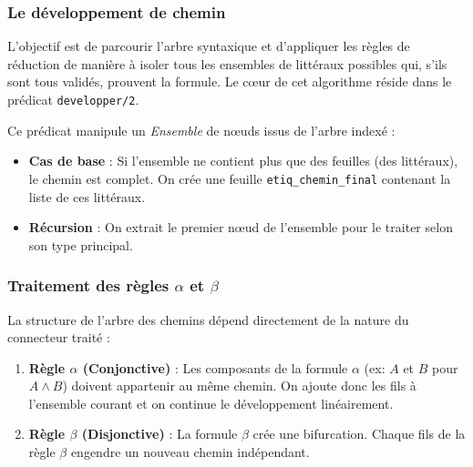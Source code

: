 \documentclass[12pt, a4paper]{article}
\begin{document}
\subsubsection{Le développement de chemin}

L'objectif est de parcourir l'arbre syntaxique et d'appliquer les règles de réduction de manière à isoler tous les ensembles de littéraux possibles qui, s'ils sont tous validés, prouvent la formule. Le cœur de cet algorithme réside dans le prédicat \texttt{developper/2}.

Ce prédicat manipule un \textit{Ensemble} de nœuds issus de l'arbre indexé :
\begin{itemize}
    \item \textbf{Cas de base} : Si l'ensemble ne contient plus que des feuilles (des littéraux), le chemin est complet. On crée une feuille \texttt{etiq\_chemin\_final} contenant la liste de ces littéraux.
    \item \textbf{Récursion} : On extrait le premier nœud de l'ensemble pour le traiter selon son type principal.
\end{itemize}

\subsubsection{Traitement des règles $\alpha$ et $\beta$}

La structure de l'arbre des chemins dépend directement de la nature du connecteur traité :

\begin{enumerate}
    \item \textbf{Règle $\alpha$ (Conjonctive)} : Les composants de la formule $\alpha$ (ex: $A$ et $B$ pour $A \land B$) doivent appartenir au même chemin. On ajoute donc les fils à l'ensemble courant et on continue le développement linéairement.
    \item \textbf{Règle $\beta$ (Disjonctive)} : La formule $\beta$ crée une bifurcation. Chaque fils de la règle $\beta$ engendre un nouveau chemin indépendant.
\end{enumerate}

\end{document}
